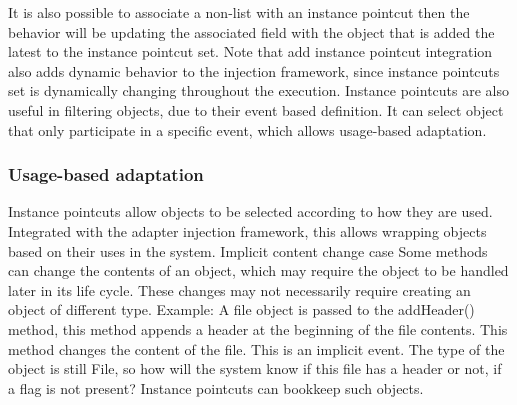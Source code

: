 \documentclass{llncs}
\begin{document}
It is also possible to associate a non-list with an instance pointcut then the behavior will be updating the associated field with the object that is added the latest to the instance pointcut set. 
Note that add instance pointcut integration also adds dynamic behavior to the injection framework, since instance pointcuts set is dynamically changing throughout the execution.
Instance pointcuts are also useful in filtering objects, due to their event based definition. It can select object that only participate in a specific event, which allows usage-based adaptation. 

\subsubsection{Usage-based adaptation}
Instance pointcuts allow objects to be selected according to how they are used. Integrated with the adapter injection framework, this allows wrapping objects based on their uses in the system.
Implicit content change case
Some methods can change the contents of an object, which may require the object to be handled later in its life cycle. These changes may not necessarily require creating an object of different type.
Example: A file object is passed to the addHeader() method, this method appends a header at the beginning of the file contents. This method changes the content of the file. This is an implicit event. The type of the object is still File, so how will the system know if this file has a header or not, if a flag is not present? Instance pointcuts can bookkeep such objects.
\end{document}
